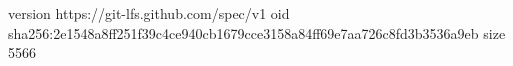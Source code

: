 version https://git-lfs.github.com/spec/v1
oid sha256:2e1548a8ff251f39c4ce940cb1679cce3158a84ff69e7aa726c8fd3b3536a9eb
size 5566
